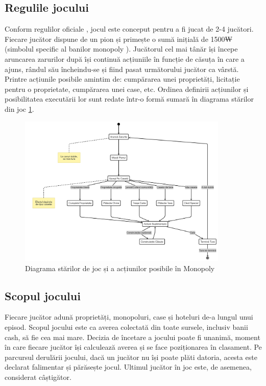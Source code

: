 \subsection{Regulile jocului}
Conform regulilor oficiale \cite{monopoly_rules}, jocul este conceput pentru a fi jucat de 2-4 jucători. Fiecare jucător dispune de un pion și primește o sumă inițială de 1500₩ (simbolul specific al banilor monopoly \cite{monopoly_money}). Jucătorul cel mai tânăr își începe aruncarea zarurilor după își continuă acțiuniile în funcție de căsuța în care a ajuns, rândul său încheindu-se și fiind pasat următorului jucător ca vârstă. Printre acțiunile posibile amintim de: cumpărarea unei proprietăți, licitație pentru o proprietate, cumpărarea unei case, etc. Ordinea definirii acțiunilor și posibilitatea executării lor sunt redate într-o formă sumară în diagrama stărilor din joc \ref{fig:monopoly-rules-state-machine}.

\begin{figure}[H]
    \centering
    \includegraphics[width=10cm]{images/monopoly_rules_state_machine.png}
    \caption{Diagrama stărilor de joc și a acțiunilor posibile în Monopoly}
    \label{fig:monopoly-rules-state-machine}
\end{figure}

\subsection{Scopul jocului}
Fiecare jucător adună proprietăți, monopoluri, case și hoteluri de-a lungul unui episod. Scopul jocului este ca averea colectată din toate sursele, inclusiv banii cash, să fie cea mai mare. Decizia de încetare a jocului poate fi unanimă, moment în care fiecare jucător își calculează averea și se face poziționarea în clasament. Pe parcursul derulării jocului, dacă un jucător nu își poate plăti datoria, acesta este declarat falimentar și părăsește jocul. Ultimul jucător în joc este, de asemenea, considerat câștigător.

